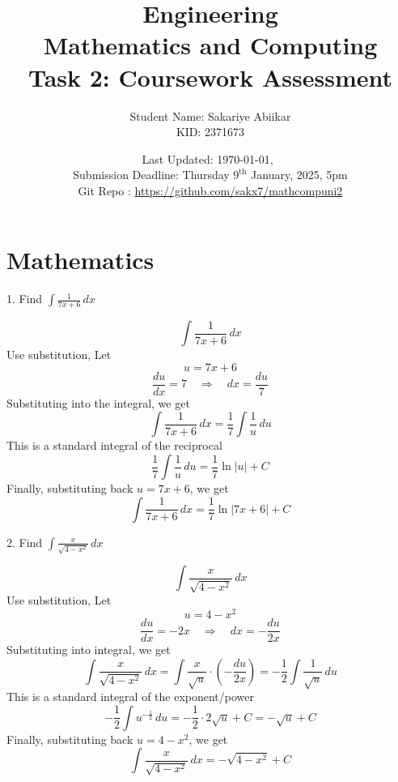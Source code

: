 \documentclass[a4paper, 12pt]{report}
\title{\vspace{3em} \Huge \textbf{Engineering\\ Mathematics and Computing}\\ \vspace{1em} \Large Task 2: Coursework Assessment}
\author{Student Name: Sakariye Abiikar\\ KID: 2371673}
\date{Last Updated: \today,\ \currenttime\\ Submission Deadline: Thursday \(9^{\text{th}}\) January, 2025, 5pm \\[1em] Git Repo : \color{blue}\url{https://github.com/sakx7/mathcompuni2}}
\def\ni{green!60!black!40!white}
\begin{document}
    
    \maketitle
    \thispagestyle{empty}
    
    \newpage
    \thispagestyle{empty}
    
    \chapter{Mathematics}
    
    \newpage\centering\restoregeometry
    
    \setcounter{page}{1}
    
    
    \begin{tcolorbox}[title={\color{black}\section{Q1}}, colback=white, colframe=\ni, boxrule=1mm, width=1\textwidth]
        1. Find \( \int \frac{1}{7x + 6} \, dx \)
    \end{tcolorbox}
    \[\int \frac{1}{7x + 6} \, dx\]
    Use substitution, Let 
    \[u = 7x + 6\]
    \[\frac{du}{dx} = 7 \quad \Rightarrow \quad dx = \frac{du}{7}\]
    Substituting into the integral, we get
    \[\int \frac{1}{7x + 6} \, dx = \frac{1}{7} \int \frac{1}{u} \, du\]
    This is a standard integral of the reciprocal
    \[\frac{1}{7} \int \frac{1}{u} \, du = \frac{1}{7} \ln |u| + C\]
    Finally, substituting back \( u = 7x + 6 \), we get
    \[\boxed{\int \frac{1}{7x + 6} \, dx = \frac{1}{7} \ln |7x + 6| + C}\]
    
    
    \newpage
    
    \begin{tcolorbox}[title={\color{black}\section{Q2}}, colback=white, colframe=\ni, boxrule=1mm, width=1\textwidth]
        2. Find \( \int \frac{x}{\sqrt{4 - x^2}} \, dx \)
    \end{tcolorbox}
    
    \[\int \frac{x}{\sqrt{4 - x^2}} \, dx\]
    Use substitution, Let\\[-1.5em] 
    \[u = 4 - x^2\]
    \[\frac{du}{dx} = -2x \quad \Rightarrow \quad dx = -\frac{du}{2x}\]
    Substituting into integral, we get
    \[\int \frac{x}{\sqrt{4 - x^2}} \, dx = \int \frac{x}{\sqrt{u}} \cdot \left(-\frac{du}{2x}\right) = -\frac{1}{2} \int \frac{1}{\sqrt{u}} \, du\]
    This is a standard integral of the exponent/power
    \[-\frac{1}{2} \int u^{-\frac{1}{2}} \, du = -\frac{1}{2} \cdot 2 \sqrt{u} + C = -\sqrt{u} + C\]
    Finally, substituting back \( u = 4 - x^2 \), we get
    \[\boxed{\int \frac{x}{\sqrt{4 - x^2}} \, dx = -\sqrt{4 - x^2} + C}\]
    
\end{document}
